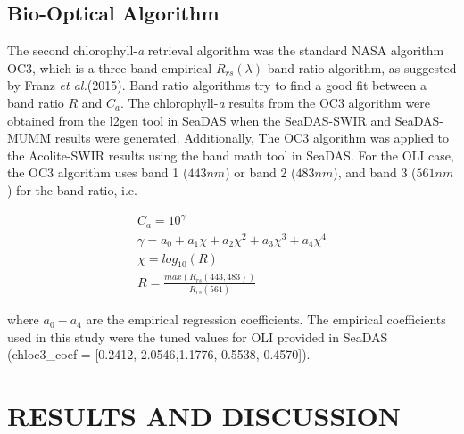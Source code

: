 \documentclass[draft]{spie}  %
\begin{document}
\subsection{Bio-Optical Algorithm}
\label{subsec:bioopticalapproach}
The second chlorophyll-{\it a} retrieval algorithm was the standard NASA algorithm OC3\cite{OReilly2000}, which is a three-band empirical $R_{rs}(\lambda)$ band ratio algorithm, as suggested by Franz {\it et al.}(2015)\cite{Franz:2015}. Band ratio algorithms try to find a good fit between a band ratio $R$ and $C_a$. The chlorophyll-{\it a} results from the OC3 algorithm were obtained from the l2gen tool in SeaDAS when the SeaDAS-SWIR and SeaDAS-MUMM results were generated. Additionally, The OC3 algorithm was applied to the Acolite-SWIR results using the band math tool in SeaDAS. For the OLI case, the OC3 algorithm uses band 1 ($443nm$) or band 2 ($483nm$), and band 3 ($561nm$) for the band ratio, i.e.

\begin{equation}
\begin{gathered}
	C_a = 10^{\gamma}\\
	\gamma = a_0+a_1\chi+a_2\chi^2+a_3\chi^3+a_4\chi^4\\
	\chi = log_{10}(R)\\
	R = \frac{max(R_{rs}(443,483))}{R_{rs}(561)}
\end{gathered}
\end{equation}

\noindent where $a_0-a_4$ are the empirical regression coefficients. The empirical coefficients used in this study were the tuned values for OLI provided in SeaDAS (chloc3\_coef = [0.2412,-2.0546,1.1776,-0.5538,-0.4570]).

\section{RESULTS AND DISCUSSION}
\label{sec:results}  %
\end{document}
